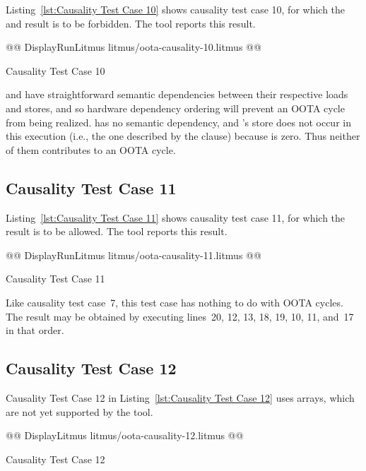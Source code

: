 \documentclass[10]{article}
\begin{document}
Listing~\ref{lst:Causality Test Case 10}
shows causality test case 10, for which the  and 
result is to be forbidden.
The  tool reports this result.

\begin{listing}[tbp]
@@ DisplayRunLitmus litmus/oota-causality-10.litmus @@
\caption{Causality Test Case 10}
\label{lst:Causality Test Case 10}
\end{listing}

 and  have straightforward
semantic dependencies between their respective loads and stores, and
so hardware dependency ordering will prevent an OOTA cycle from being
realized.
 has no semantic dependency, and 's store does not
occur in this execution (i.e., the one described by the  clause)
because  is zero.
Thus neither of them contributes to an OOTA cycle.

\subsection{Causality Test Case 11}
\label{app:Causality Test Case 11}

Listing~\ref{lst:Causality Test Case 11}
shows causality test case 11, for which the 
result is to be allowed.
The  tool reports this result.

\begin{listing}[tbp]
@@ DisplayRunLitmus litmus/oota-causality-11.litmus @@
\caption{Causality Test Case 11}
\label{lst:Causality Test Case 11}
\end{listing}

Like causality test case~7, this test case has nothing to do with OOTA cycles.
The result may be obtained by executing lines~20, 12, 13, 18, 19, 10, 11,
and~17 in that order.

\subsection{Causality Test Case 12}
\label{app:Causality Test Case 12}

Causality Test Case 12 in
Listing~\ref{lst:Causality Test Case 12}
uses arrays, which are not yet supported by the  tool.

\begin{listing}[tbp]
@@ DisplayLitmus litmus/oota-causality-12.litmus @@
\caption{Causality Test Case 12}
\label{lst:Causality Test Case 12}
\end{listing}
\end{document}
